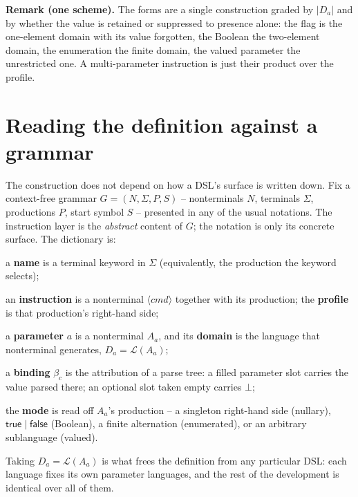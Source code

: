 \documentclass[11pt]{article}
\begin{document}
\textbf{Remark (one scheme).} The forms are a single construction graded by
\(\lvert D_a\rvert\) and by whether the value is retained or suppressed to
presence alone: the flag is the one-element domain with its value forgotten, the
Boolean the two-element domain, the enumeration the finite domain, the valued
parameter the unrestricted one. A multi-parameter instruction is just their
product over the profile.

\section*{Reading the definition against a grammar}

The construction does not depend on how a DSL's surface is written down. Fix a
context-free grammar \(G=(N,\Sigma,P,S)\) -- nonterminals \(N\), terminals
\(\Sigma\), productions \(P\), start symbol \(S\) -- presented in any of the usual
notations. The instruction layer is the \emph{abstract} content of \(G\); the
notation is only its concrete surface. The dictionary is:

\begin{definitionlist}
    \item a \textbf{name} is a terminal keyword in \(\Sigma\) (equivalently, the
          production the keyword selects);
    \item an \textbf{instruction} is a nonterminal \(\langle\textit{cmd}\rangle\)
          together with its production; the \textbf{profile} is that production's
          right-hand side;
    \item a \textbf{parameter} \(a\) is a nonterminal \(A_a\), and its
          \textbf{domain} is the language that nonterminal generates,
          \(D_a=\mathcal{L}(A_a)\);
    \item a \textbf{binding} \(\beta_c\) is the attribution of a parse tree: a
          filled parameter slot carries the value parsed there; an optional slot
          taken empty carries \(\bot\);
    \item the \textbf{mode} is read off \(A_a\)'s production -- a singleton
          right-hand side (nullary), \(\mathsf{true}\mid\mathsf{false}\)
          (Boolean), a finite alternation (enumerated), or an arbitrary
          sublanguage (valued).
\end{definitionlist}

Taking \(D_a=\mathcal{L}(A_a)\) is what frees the definition from any particular
DSL: each language fixes its own parameter languages, and the rest of the
development is identical over all of them.
\end{document}
